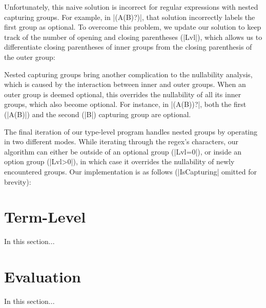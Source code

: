 \regexNaiveIsNullable
%

\noindent
Unfortunately, this naive solution is incorrect for regular expressions with nested capturing groups.
For example, in |(A(B)?)|, that solution incorrectly labels the first group as optional.
To overcome this problem, we update our solution to keep track of the number of opening and closing parentheses (|Lvl|), which allows us to differentiate closing parentheses of inner groups from the closing parenthesis of the outer group:

\regexIsNullable

Nested capturing groups bring another complication to the nullability analysis, which is caused by the interaction between inner and outer groups.
When an outer group is deemed optional, this overrides the nullability of all its inner groups, which also become optional.
For instance, in |(A(B))?|, both the first (|A(B)|) and the second (|B|) capturing group are optional.

The final iteration of our type-level program handles nested groups by operating in two different modes.
While iterating through the regex's characters, our algorithm can either be outside of an optional group (|Lvl=0|), or inside an option group (|Lvl>0|), in which case it overrides the nullability of newly encountered groups.
Our implementation is as follows (|IsCapturing| omitted for brevity):

\regexLastIteration

\section{Term-Level}
\label{sec:term-level}

In this section...

\section{Evaluation}

In this section...
